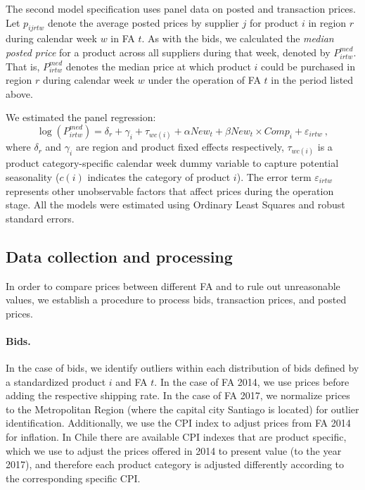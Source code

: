 The second model specification uses panel data on posted and transaction prices. Let $p_{ijrtw}$ denote the average posted prices by supplier $j$ for product $i$ in region $r$ during calendar week $w$ in FA $t$. As with the bids, we calculated the {\em median posted price} for a product across all suppliers during that week, denoted by $P^{med}_{irtw}$. That is, $P^{med}_{irtw}$ denotes the median price at which product $i$ could be purchased in region $r$ during calendar week $w$ under the operation of FA $t$ in the period listed above. 

We estimated the panel regression:
\begin{equation}
    \log (P^{med}_{irtw})= \delta_r + \gamma_i + \tau_{wc(i)} + \alpha New_{t} + \beta New_{t}\times Comp_{i} + \varepsilon_{irtw} \ ,
    \label{eq:reg_op_posted}
\end{equation}
\noindent where $\delta_r$ and $\gamma_i$ are region and product fixed effects respectively, $\tau_{wc(i)}$ is a product category-specific calendar week dummy variable to capture potential seasonality ($c(i)$ indicates the category of product $i$). {The error term $\varepsilon_{irtw}$ represents other unobservable factors that affect prices during the operation stage.} All the models were estimated using Ordinary Least Squares and robust standard errors. 

\subsection{Data collection and processing}
In order to compare prices between different FA and to rule out unreasonable values, we establish a procedure to process bids, transaction prices, and posted prices.

\paragraph{Bids.}  In the case of bids, we identify outliers within each distribution of bids defined by a standardized product $i$ and FA $t$. In the case of FA 2014, we use prices before adding the respective shipping rate. In the case of FA 2017, we normalize prices to the Metropolitan Region (where the capital city Santiago is located) for outlier identification. Additionally, we use the CPI index to adjust prices from FA 2014 for inflation. In Chile there are available CPI indexes that are product specific, which we use to adjust the prices offered in 2014 to present value (to the year 2017), and therefore each product category is adjusted differently according to the corresponding specific CPI. 

